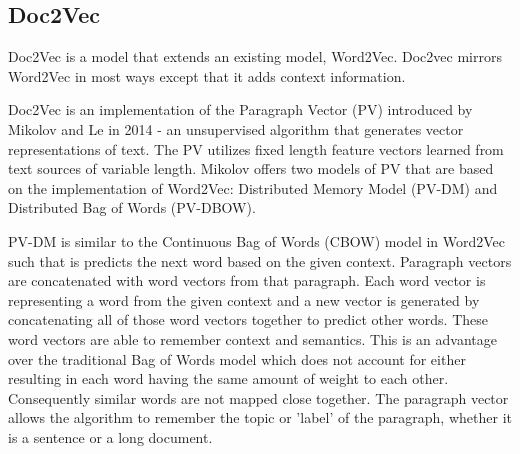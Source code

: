 



\subsection{Doc2Vec}
Doc2Vec is a model that extends an existing model, Word2Vec. Doc2vec mirrors Word2Vec in most ways except that it adds context information. \cite{RefWorks:doc:5a6e5748e4b0d609eec798dd}





	Doc2Vec is an implementation of the Paragraph Vector (PV) introduced by Mikolov and Le in 2014 - an unsupervised algorithm that generates vector representations of text. \cite{RefWorks:doc:5a6e5746e4b0d609eec798d7} The PV utilizes fixed length feature vectors learned from text sources of variable length. Mikolov offers two models of PV that are based on the implementation of Word2Vec: Distributed Memory Model (PV-DM) and Distributed Bag of Words (PV-DBOW).


PV-DM is similar to the Continuous Bag of Words (CBOW) model in Word2Vec such that is predicts the next word based on the given context. Paragraph vectors are concatenated with word vectors from that paragraph.  Each word vector is representing a word from the given context and a new vector is generated by concatenating all of those word vectors together to predict other words. These word vectors are able to remember context and semantics. This is an advantage over the traditional Bag of Words model which does not account for either resulting in each word having the same amount of weight to each other. Consequently similar words are not mapped close together. The paragraph vector allows the algorithm to remember the topic or 'label' of the paragraph, whether it is a sentence or a long document. 

